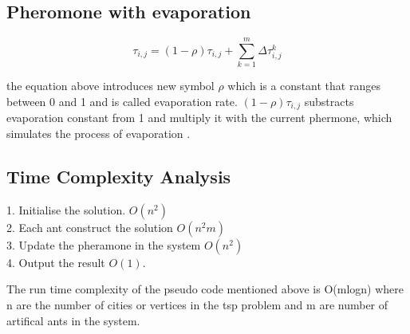 \documentclass{article}
\begin{document}
\subsection*{Pheromone with evaporation}
\begin{equation}
	\tau_{i, j} = (1-\rho) \tau_{i,j} + \sum_{k=1}^m \Delta{\tau_{i, j} ^k}
\end{equation} 

the equation above introduces new symbol ${\rho}$ which is a constant that ranges between 0 and 1 and is called evaporation rate. ${(1-\rho) \tau_{i,j}}$ substracts evaporation constant from 1 and multiply it with the current phermone, which simulates the process of evaporation \citep*{4129846}.

\subsection*{Time Complexity Analysis}

1. Initialise the solution. ${O(n^2)}$ \\
2. Each ant construct the solution ${O(n^2 m)}$ \\
3. Update the pheramone in the system ${O(n^2)}$ \\
4. Output the result ${O(1)}$.

The run time complexity of the pseudo code mentioned above is O(mlogn) where n are the number of cities or vertices in the tsp problem and m are number of artifical ants in the system.  
\citep*{GUTJAHR20082711}


 
\end{document}
